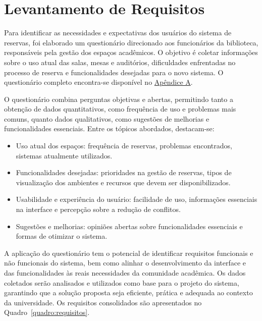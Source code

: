 \section{Levantamento de Requisitos}\label{sec:requisitos}
Para identificar as necessidades e expectativas dos usuários do sistema de reservas, foi elaborado um questionário direcionado aos funcionários da biblioteca, responsáveis pela gestão dos espaços acadêmicos. O objetivo é coletar informações sobre o uso atual das salas, mesas e auditórios, dificuldades enfrentadas no processo de reserva e funcionalidades desejadas para o novo sistema. O questionário completo encontra-se disponível no \hyperref[apendice:entrevistas]{Apêndice A}.

O questionário combina perguntas objetivas e abertas, permitindo tanto a obtenção de dados quantitativos, como frequência de uso e problemas mais comuns, quanto dados qualitativos, como sugestões de melhorias e funcionalidades essenciais. Entre os tópicos abordados, destacam-se:
\begin{itemize}
  \item Uso atual dos espaços: frequência de reservas, problemas encontrados, sistemas atualmente utilizados.
  \item Funcionalidades desejadas: prioridades na gestão de reservas, tipos de visualização dos ambientes e recursos que devem ser disponibilizados.
  \item Usabilidade e experiência do usuário: facilidade de uso, informações essenciais na interface e percepção sobre a redução de conflitos.
  \item Sugestões e melhorias: opiniões abertas sobre funcionalidades essenciais e formas de otimizar o sistema.
\end{itemize}

A aplicação do questionário tem o potencial de identificar requisitos funcionais e não funcionais do sistema, bem como alinhar o desenvolvimento da interface e das funcionalidades às reais necessidades da comunidade acadêmica. Os dados coletados serão analisados e utilizados como base para o projeto do sistema, garantindo que a solução proposta seja eficiente, prática e adequada ao contexto da universidade. Os requisitos consolidados são apresentados no Quadro~\ref{quadro:requisitos}.

